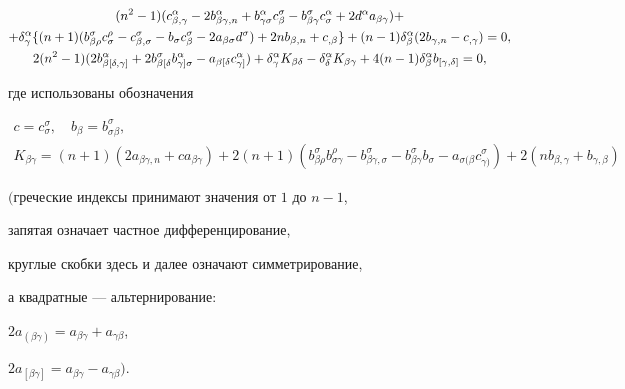 \begin{thms}
\begin{gather}
(n^2-1)(c^\alpha_{\beta,\gamma}-2b^\alpha_{\beta\gamma,n}+


b^\alpha_{\gamma\sigma}c^\sigma_\beta-b^\sigma_{\beta\gamma}c^\alpha_{\sigma}+


2d^\alpha a_{\beta\gamma})+\notag \\


%


+\delta^\alpha_{\gamma}\{(n+1)(b^\sigma_{\beta\rho}


c^\rho_\sigma-c^\sigma_{\beta,\sigma}-b_\sigma c^\sigma_\beta-


2a_{\beta\sigma}d^\sigma)+2n b_{\beta,n}+c_{,\beta}\}+


(n-1)\delta^\alpha_{\beta}(2b_{\gamma,n}-c_{,\gamma})=0,\notag \\


%


2(n^2-1)(2b{}^\alpha_{\beta[\delta,\gamma]}+


2b{}^\sigma_{\beta[\delta} b{}^\alpha_{\gamma]\sigma}-a{}_{\beta[\delta}


c{}^\alpha_{\gamma]})+\delta^\alpha_\gamma K_{\beta\delta}


-\delta^\alpha_\delta K_{\beta\gamma}+


4(n-1)\delta^\alpha_\beta b{}_{[\gamma,\delta]}=0,\notag


\end{gather}


где использованы обозначения


\begin{gather*}


c=c^\sigma_\sigma, \quad b_\beta= b^\sigma_{\sigma\beta},\\


%


K_{\beta\gamma}=(n+1)(2 a_{\beta\gamma,n}+c a_{\beta\gamma})+


2(n+1)(b^\sigma_{\beta\rho}b^\rho_{\sigma\gamma}-b^\sigma_


{\beta\gamma,\sigma}-b^\sigma_{\beta\gamma} b_{\sigma}-a_{\sigma(\beta}


c^\sigma_{\gamma)})+


2(nb_{\beta,\gamma}+b_{\gamma,\beta})


\end{gather*}


$($греческие индексы принимают значения от $1$ до $n-1$,


запятая означает частное дифференцирование,


круглые скобки здесь и далее означают симметрирование,


а квадратные --- альтернирование\/${:}$


$2a_{(\beta\gamma)}=a_{\beta\gamma}+a_{\gamma\beta}$,


$2a_{[\beta\gamma]}=a_{\beta\gamma}-a_{\gamma\beta})$.


\end{thms}








